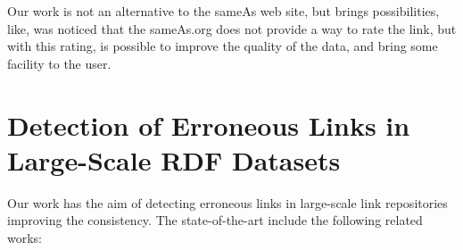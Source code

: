 Our work is not an alternative to the sameAs web site, but brings possibilities, like, was noticed that the sameAs.org does not provide a way to rate the link, but with this rating, is possible to improve the quality of the data, and bring some facility to the user.

\section{Detection of Erroneous Links in Large-Scale RDF Datasets}
Our work has the aim of detecting erroneous links in large-scale link repositories improving the consistency. The state-of-the-art include the following related works:


